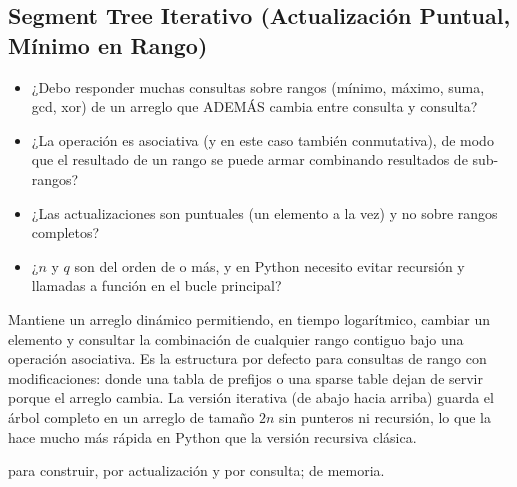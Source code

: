\subsection{Segment Tree Iterativo (Actualización Puntual, Mínimo en Rango)}
\label{alg:3-4}


\begin{itemize}
\item ¿Debo responder muchas consultas sobre rangos (mínimo, máximo, suma, gcd, xor) de un arreglo que ADEMÁS cambia entre consulta y consulta?
\item ¿La operación es asociativa (y en este caso también conmutativa), de modo que el resultado de un rango se puede armar combinando resultados de sub-rangos?
\item ¿Las actualizaciones son puntuales (un elemento a la vez) y no sobre rangos completos?
\item ¿$n$ y $q$ son del orden de  o más, y en Python necesito evitar recursión y llamadas a función en el bucle principal?
\end{itemize}

 Mantiene un arreglo dinámico permitiendo, en tiempo logarítmico, cambiar un elemento y consultar la combinación de cualquier rango contiguo bajo una operación asociativa. Es la estructura por defecto para consultas de rango con modificaciones: donde una tabla de prefijos o una sparse table dejan de servir porque el arreglo cambia. La versión iterativa (de abajo hacia arriba) guarda el árbol completo en un arreglo de tamaño $2n$ sin punteros ni recursión, lo que la hace mucho más rápida en Python que la versión recursiva clásica.

  para construir,  por actualización y por consulta;  de memoria.

